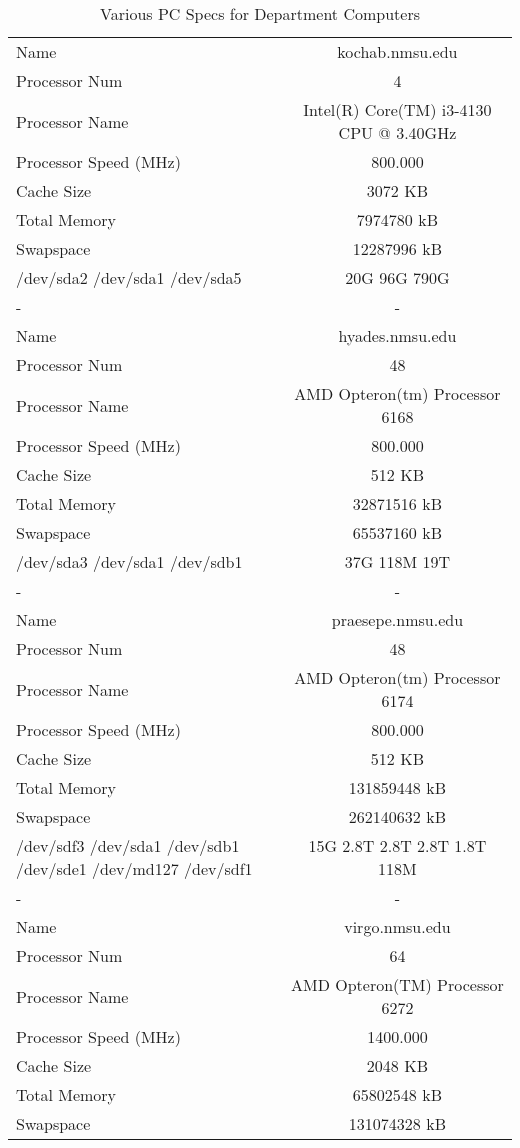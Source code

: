 \documentclass{article}
\begin{document}
\begin{table}
\caption{Various PC Specs for Department Computers}
\begin{tabular}{l || c}
Name & kochab.nmsu.edu \\
Processor Num & 4 \\
Processor Name & Intel(R) Core(TM) i3-4130 CPU @ 3.40GHz \\
Processor Speed (MHz) & 800.000 \\
Cache Size & 3072 KB \\
Total Memory & 7974780 kB \\
Swapspace & 12287996 kB \\
/dev/sda2 /dev/sda1 /dev/sda5 & 20G 96G 790G \\
- & - \\
Name & hyades.nmsu.edu \\
Processor Num & 48 \\
Processor Name & AMD Opteron(tm) Processor 6168 \\
Processor Speed (MHz) & 800.000 \\
Cache Size & 512 KB \\
Total Memory & 32871516 kB \\
Swapspace & 65537160 kB \\
/dev/sda3 /dev/sda1 /dev/sdb1 & 37G 118M 19T \\
- & - \\
Name & praesepe.nmsu.edu \\
Processor Num & 48 \\
Processor Name & AMD Opteron(tm) Processor 6174 \\
Processor Speed (MHz) & 800.000 \\
Cache Size & 512 KB \\
Total Memory & 131859448 kB \\
Swapspace & 262140632 kB \\
/dev/sdf3 /dev/sda1 /dev/sdb1 /dev/sde1 /dev/md127 /dev/sdf1 & 15G 2.8T 2.8T 2.8T 1.8T 118M \\
- & - \\
Name & virgo.nmsu.edu \\
Processor Num & 64 \\
Processor Name & AMD Opteron(TM) Processor 6272 \\
Processor Speed (MHz) & 1400.000 \\
Cache Size & 2048 KB \\
Total Memory & 65802548 kB \\
Swapspace & 131074328 kB \\

\end{tabular}
\end{table}
\end{document}
